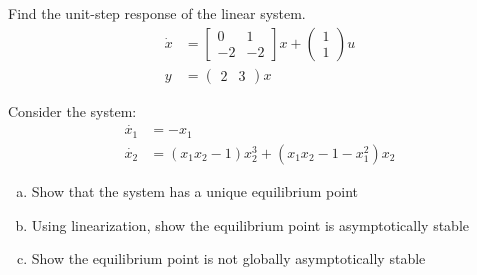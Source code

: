 \documentclass[11pt]{article}
\begin{document}
\soln





Find the unit-step response of the linear system.
\begin{align*}
    \dot{x} &= \begin{bmatrix}
        0 & 1 \\ -2 & -2
    \end{bmatrix} x + \begin{pmatrix}
        1 \\ 1
    \end{pmatrix} u\\
    y &= \begin{pmatrix}
        2 & 3
    \end{pmatrix} x
\end{align*}
\soln



Consider the system:
\begin{align*}
    \dot{x_1} &= -x_1\\
    \dot{x_2} &= (x_1x_2 - 1)x_2^3 + (x_1x_2 - 1 - x_1^2)x_2
\end{align*}

\begin{enumerate}[(a)]
    \item Show that the system has a unique equilibrium point
    \item Using linearization, show the equilibrium point is asymptotically stable
    \item Show the equilibrium point is not globally asymptotically stable
\end{enumerate}
\soln
\end{document}
